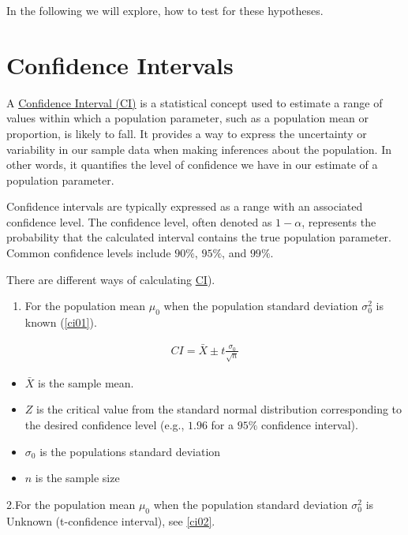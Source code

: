\documentclass[
  a4paper,
]{scrbook}
\providecommand{\tightlist}{%
  \setlength{\itemsep}{0pt}\setlength{\parskip}{0pt}}\usepackage{longtable,booktabs,array}
\begin{document}
In the following we will explore, how to test for these hypotheses.

\section{Confidence Intervals}\label{confidence-intervals}

A \hyperref[acronyms_CI]{Confidence Interval (CI)} is a statistical
concept used to estimate a range of values within which a population
parameter, such as a population mean or proportion, is likely to fall.
It provides a way to express the uncertainty or variability in our
sample data when making inferences about the population. In other words,
it quantifies the level of confidence we have in our estimate of a
population parameter.

Confidence intervals are typically expressed as a range with an
associated confidence level. The confidence level, often denoted as
\(1-\alpha\), represents the probability that the calculated interval
contains the true population parameter. Common confidence levels include
\(90\%\), \(95\%\), and \(99\%\).

There are different ways of calculating \hyperref[acronyms_CI]{CI}).

\begin{enumerate}
\def\labelenumi{\arabic{enumi}.}
\tightlist
\item
  For the population mean \hyperref[truemean-gloss]{\(\mu_0\)} when the
  population standard deviation
  \hyperref[truevariance-gloss]{\(\sigma_0^2\)} is known (\eqref{ci01}).
\end{enumerate}

\begin{align}
CI = \bar{X} \pm t \frac{\sigma_0}{\sqrt{n}} \label{ci01}
\end{align}

\begin{itemize}
\item
  \(\bar{X}\) is the sample mean.
\item
  \(Z\) is the critical value from the standard normal distribution
  corresponding to the desired confidence level (e.g., \(1.96\) for a
  \(95\%\) confidence interval).
\item
  \(\sigma_0\) is the populations standard deviation
\item
  \(n\) is the sample size
\end{itemize}

2.For the population mean \hyperref[truemean-gloss]{\(\mu_0\)} when the
population standard deviation
\hyperref[truevariance-gloss]{\(\sigma_0^2\)} is Unknown (t-confidence
interval), see \eqref{ci02}.
\end{document}
